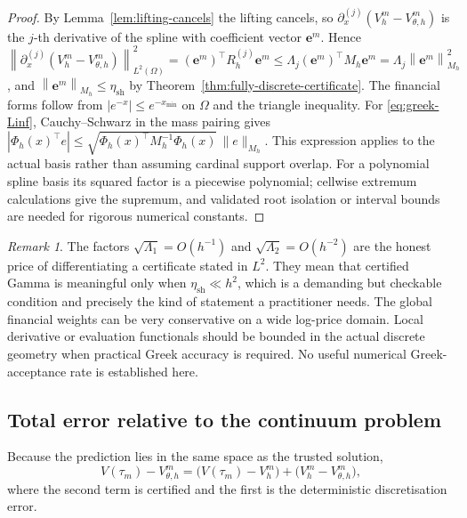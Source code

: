 \documentclass[11pt]{amsart}
\theoremstyle{remark}
\newtheorem{remark}[theorem]{Remark}
\newcommand{\Mh}{M_h}
\newcommand{\norm}[1]{\left\lVert #1\right\rVert}
\newcommand{\etaSharp}{\eta_{\mathrm{sh}}}
\newcommand{\ee}{\mathbf e}
\begin{document}
\begin{proof}
By Lemma~\ref{lem:lifting-cancels} the lifting cancels, so
$\partial_x^{(j)}(V_h^m-V_{\theta,h}^m)$ is the $j$-th derivative of the
spline with coefficient vector $\ee^m$.  Hence
$\norm{\partial_x^{(j)}(V_h^m-V_{\theta,h}^m)}_{L^2(\Omega)}^2
=(\ee^m)^\top R_h^{(j)}\ee^m\le\Lambda_j(\ee^m)^\top\Mh\ee^m
=\Lambda_j\norm{\ee^m}_{\Mh}^2$, and
$\norm{\ee^m}_{\Mh}\le\etaSharp$ by
Theorem~\ref{thm:fully-discrete-certificate}.  The financial forms follow from
$|e^{-x}|\le e^{-x_{\min}}$ on $\Omega$ and the triangle inequality.  For \eqref{eq:greek-Linf}, Cauchy--Schwarz in the mass pairing gives
$|\Phi_h(x)^\top e|\le
\sqrt{\Phi_h(x)^\top M_h^{-1}\Phi_h(x)}\,\|e\|_{M_h}$.
This expression applies to the actual basis rather than assuming cardinal
support overlap. For a polynomial spline basis its squared factor is a
piecewise polynomial; cellwise extremum calculations give the supremum,
and validated root isolation or interval bounds are needed for rigorous
numerical constants.
\end{proof}

\begin{remark}
The factors $\sqrt{\Lambda_1}=O(h^{-1})$ and $\sqrt{\Lambda_2}=O(h^{-2})$ are
the honest price of differentiating a certificate stated in $L^2$.  They mean
that certified Gamma is meaningful only when $\etaSharp\ll h^2$, which is a
demanding but checkable condition and precisely the kind of statement a
practitioner needs.  The global financial weights can be very conservative on a wide log-price
domain. Local derivative or evaluation functionals should be bounded in the
actual discrete geometry when practical Greek accuracy is required. No
useful numerical Greek-acceptance rate is established here.
\end{remark}

\subsection{Total error relative to the continuum problem}
\label{ssec:total-error}

Because the prediction lies in the same space as the trusted solution,
\begin{equation}
  V(\tau_m)-V_{\theta,h}^m
  =\bigl(V(\tau_m)-V_h^m\bigr)+\bigl(V_h^m-V_{\theta,h}^m\bigr),
  \label{eq:total-error-split}
\end{equation}
where the second term is certified and the first is the deterministic
discretisation error.
\end{document}

